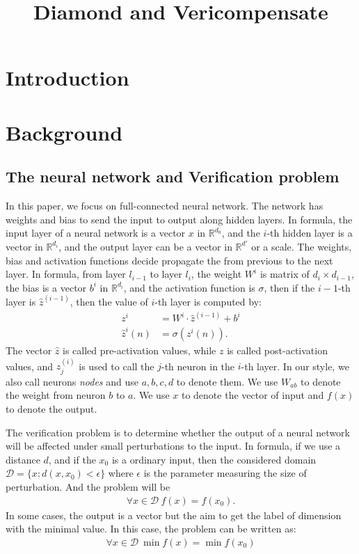 \documentclass[8pt]{article}
\title{Diamond and Vericompensate}
\date{}
\theoremstyle{definition}
\begin{document}
\maketitle

\section{Introduction}

\section{Background}

\subsection{The neural network and Verification problem}


In this paper, we focus on full-connected neural network. The network has weights and bias to send the input to output along hidden layers. In formula, the input layer of a neural network is a vector $x$ in $\mathbb{R}^{d_0}$, and the $i$-th hidden layer  is a vector in $\mathbb{R}^{d_i}$, and the output layer can be a vector in $\mathbb{R}^{d'}$ or a scale. The weights, bias and activation functions decide propagate the from previous to the next layer. In formula, from layer $l_{i-1}$ to layer $l_{i}$, the weight $W^i$ is matrix of $d_i\times d_{i-1}$, the bias is a vector $b^i$ in $\mathbb{R}^{d_i}$, and the activation function is $\sigma$, then  if the $i-1$-th layer is $\hat{z}^{(i-1)}$, then the value of $i$-th layer is computed by: \begin{align*}
	{z}^{i} &= W^i\cdot \hat{z}^{(i-1)}+ b^i\\
	\hat{z}^{i}(n) &= \sigma({z}^i(n)).
\end{align*} The vector $\hat{z}$ is called pre-activation values, while $z$ is called post-activation values, and $z^{(i)}_j$ is used to call the $j$-th neuron in the $i$-th layer. In our style, we also call neurons \emph{nodes} and use $a,b,c,d$ to denote them. We use $W_{ab}$ to denote the weight from neuron $b$ to $a$. We use $x$ to denote the vector of input and  $f(x)$ to denote the output.


The verification problem is to determine whether the output of a neural network will be affected under small perturbations to the input. In formula, if we use a distance $d$, and if the $x_0$ is a ordinary input, then the considered domain $\mathcal{D}=\{x: d(x,x_0)<\epsilon\}$ where $\epsilon$ is the parameter measuring the size of perturbation. And the problem will be \begin{align*}
	\forall x\in\mathcal{D} \   f(x) = f(x_0).
\end{align*} In some cases, the output is a vector but the aim to get the label of dimension with the minimal value. In this case, the problem can be written as:\begin{align*}
\forall x \in\mathcal{D} \  \min f(x) = \min f(x_0)
\end{align*}
\end{document}
